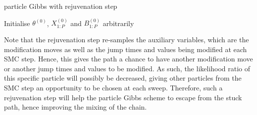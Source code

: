 \documentclass[12pt,a4paper]{article}
\begin{document}
\begin{algorithm}[htb!]
    \caption{particle Gibbs with rejuvenation step}
            Initialise $\theta^{(0)}$, $X_{1:P}^{(0)}$ and $B_{1:P}^{(0)}$ arbitrarily\;
    \label{particle Gibbs-rejuvenation}
\end{algorithm}

Note that the rejuvenation step re-samples the auxiliary variables, which are the modification moves as well as the jump times and values being modified at each SMC step. Hence, this gives the path a chance to have another modification move or another jump times and values to be modified. As such, the likelihood ratio of this specific particle will possibly be decreased, giving other particles from the SMC step an opportunity to be chosen at each sweep. Therefore, such a rejuvenation step will help the particle Gibbs scheme to escape from the stuck path, hence improving the mixing of the chain. 

\newpage


\end{document}
